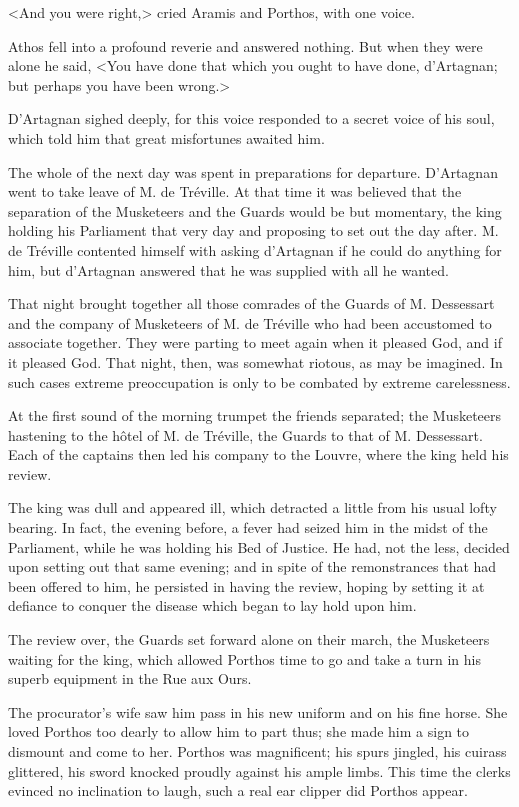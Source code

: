 <And you were right,> cried Aramis and Porthos, with one voice. 

Athos fell into a profound reverie and answered nothing. But when they were alone he said, <You have done that which you ought to have done, d'Artagnan; but perhaps you have been wrong.> 

D'Artagnan sighed deeply, for this voice responded to a secret voice of his soul, which told him that great misfortunes awaited him. 

The whole of the next day was spent in preparations for departure. D'Artagnan went to take leave of M. de Tréville. At that time it was believed that the separation of the Musketeers and the Guards would be but momentary, the king holding his Parliament that very day and proposing to set out the day after. M. de Tréville contented himself with asking d'Artagnan if he could do anything for him, but d'Artagnan answered that he was supplied with all he wanted. 

That night brought together all those comrades of the Guards of M. Dessessart and the company of Musketeers of M. de Tréville who had been accustomed to associate together. They were parting to meet again when it pleased God, and if it pleased God. That night, then, was somewhat riotous, as may be imagined. In such cases extreme preoccupation is only to be combated by extreme carelessness. 

At the first sound of the morning trumpet the friends separated; the Musketeers hastening to the hôtel of M. de Tréville, the Guards to that of M. Dessessart. Each of the captains then led his company to the Louvre, where the king held his review. 

The king was dull and appeared ill, which detracted a little from his usual lofty bearing. In fact, the evening before, a fever had seized him in the midst of the Parliament, while he was holding his Bed of Justice. He had, not the less, decided upon setting out that same evening; and in spite of the remonstrances that had been offered to him, he persisted in having the review, hoping by setting it at defiance to conquer the disease which began to lay hold upon him. 

The review over, the Guards set forward alone on their march, the Musketeers waiting for the king, which allowed Porthos time to go and take a turn in his superb equipment in the Rue aux Ours. 

The procurator's wife saw him pass in his new uniform and on his fine horse. She loved Porthos too dearly to allow him to part thus; she made him a sign to dismount and come to her. Porthos was magnificent; his spurs jingled, his cuirass glittered, his sword knocked proudly against his ample limbs. This time the clerks evinced no inclination to laugh, such a real ear clipper did Porthos appear. 


